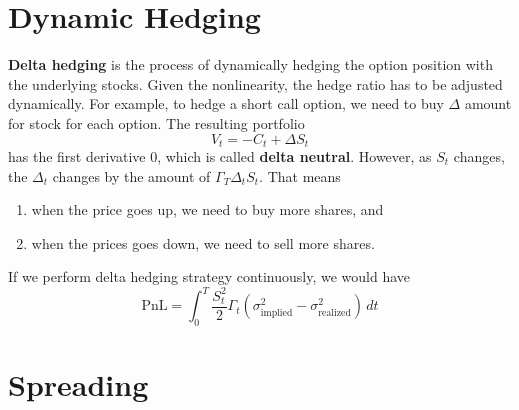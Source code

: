 \documentclass{article}
\begin{document}
\section{Dynamic Hedging}

  \begin{definition}
    \textbf{Delta hedging} is the process of dynamically hedging the option position with the underlying stocks. Given the nonlinearity, the hedge ratio has to be adjusted dynamically. For example, to hedge a short call option, we need to buy $\Delta$ amount for stock for each option. The resulting portfolio 
    \begin{equation}
      V_t = -C_t + \Delta S_t
    \end{equation}
    has the first derivative $0$, which is called \textbf{delta neutral}. However, as $S_t$ changes, the $\Delta_t$ changes by the amount of $\Gamma_T \Delta_t S_t$. That means 
    \begin{enumerate}
      \item when the price goes up, we need to buy more shares, and 
      \item when the prices goes down, we need to sell more shares. 
    \end{enumerate}
  \end{definition}

  If we perform delta hedging strategy continuously, we would have 
  \begin{equation}
    \text{PnL} = \int_0^T \frac{S_t^2}{2} \Gamma_t (\sigma_{\text{implied}}^2 - \sigma_{\text{realized}}^2 )\, dt
  \end{equation}

\section{Spreading}
\end{document}
